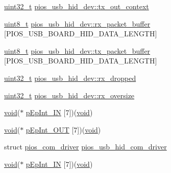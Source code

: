 \begin{DoxyCompactItemize}
\hyperlink{stdint_8h_a435d1572bf3f880d55459d9805097f62}{uint32\-\_\-t} \hyperlink{group___p_i_o_s___u_s_b___h_i_d_ga1a95563a3fb1aee312d7793c77f81bf2}{pios\-\_\-usb\-\_\-hid\-\_\-dev\-::tx\-\_\-out\-\_\-context}
\item 
\hyperlink{stdint_8h_aba7bc1797add20fe3efdf37ced1182c5}{uint8\-\_\-t} \hyperlink{group___p_i_o_s___u_s_b___h_i_d_ga20fb92cd6b239abc72cb0ac8b93b11b4}{pios\-\_\-usb\-\_\-hid\-\_\-dev\-::rx\-\_\-packet\-\_\-buffer} \mbox{[}P\-I\-O\-S\-\_\-\-U\-S\-B\-\_\-\-B\-O\-A\-R\-D\-\_\-\-H\-I\-D\-\_\-\-D\-A\-T\-A\-\_\-\-L\-E\-N\-G\-T\-H\mbox{]}
\item 
\hyperlink{stdint_8h_aba7bc1797add20fe3efdf37ced1182c5}{uint8\-\_\-t} \hyperlink{group___p_i_o_s___u_s_b___h_i_d_gad6c7b8ecc0fe215e9d18d6d3281977c6}{pios\-\_\-usb\-\_\-hid\-\_\-dev\-::tx\-\_\-packet\-\_\-buffer} \mbox{[}P\-I\-O\-S\-\_\-\-U\-S\-B\-\_\-\-B\-O\-A\-R\-D\-\_\-\-H\-I\-D\-\_\-\-D\-A\-T\-A\-\_\-\-L\-E\-N\-G\-T\-H\mbox{]}
\item 
\hyperlink{stdint_8h_a435d1572bf3f880d55459d9805097f62}{uint32\-\_\-t} \hyperlink{group___p_i_o_s___u_s_b___h_i_d_ga4ecf07921bfe18b2457b8d0c4c874990}{pios\-\_\-usb\-\_\-hid\-\_\-dev\-::rx\-\_\-dropped}
\item 
\hyperlink{stdint_8h_a435d1572bf3f880d55459d9805097f62}{uint32\-\_\-t} \hyperlink{group___p_i_o_s___u_s_b___h_i_d_gaddc9bf1640b3a06aff88c4adaa6d3601}{pios\-\_\-usb\-\_\-hid\-\_\-dev\-::rx\-\_\-oversize}
\item 
\hyperlink{group___n_a_m_e_ga18028b8badbf1ea7e704ccac3c488e82}{void}($\ast$ \hyperlink{group___p_i_o_s___u_s_b___h_i_d_ga0992c19a0f2e317fcd93f755d316a0fd}{p\-Ep\-Int\-\_\-\-I\-N} \mbox{[}7\mbox{]})(\hyperlink{group___n_a_m_e_ga18028b8badbf1ea7e704ccac3c488e82}{void})
\item 
\hyperlink{group___n_a_m_e_ga18028b8badbf1ea7e704ccac3c488e82}{void}($\ast$ \hyperlink{group___p_i_o_s___u_s_b___h_i_d_ga549396ff4348c565f52117dd27ad52ca}{p\-Ep\-Int\-\_\-\-O\-U\-T} \mbox{[}7\mbox{]})(\hyperlink{group___n_a_m_e_ga18028b8badbf1ea7e704ccac3c488e82}{void})
\item 
struct \hyperlink{structpios__com__driver}{pios\-\_\-com\-\_\-driver} \hyperlink{group___p_i_o_s___u_s_b___h_i_d_ga7bc5f832e095cad60f463436e377bb5d}{pios\-\_\-usb\-\_\-hid\-\_\-com\-\_\-driver}
\item 
\hyperlink{group___n_a_m_e_ga18028b8badbf1ea7e704ccac3c488e82}{void}($\ast$ \hyperlink{group___p_i_o_s___u_s_b___h_i_d_ga0992c19a0f2e317fcd93f755d316a0fd}{p\-Ep\-Int\-\_\-\-I\-N} \mbox{[}7\mbox{]})(\hyperlink{group___n_a_m_e_ga18028b8badbf1ea7e704ccac3c488e82}{void})

\end{DoxyCompactItemize}
